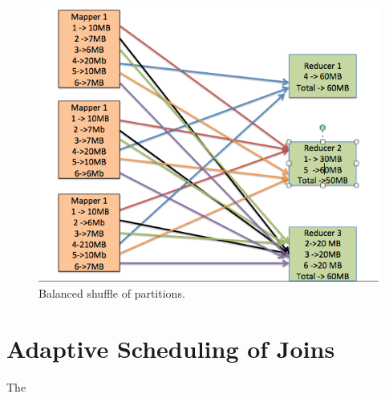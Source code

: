  \begin{figure}[h]
\begin{center}
\includegraphics[scale=1.0]{./img/shuffle_balanced.png}
\caption{Balanced shuffle of partitions.}
\label{fig:shuffle_balanced.png}
\end{center}
\end{figure}

\section{Adaptive Scheduling of Joins}\label{intro-ch:eeg-overview}
The

